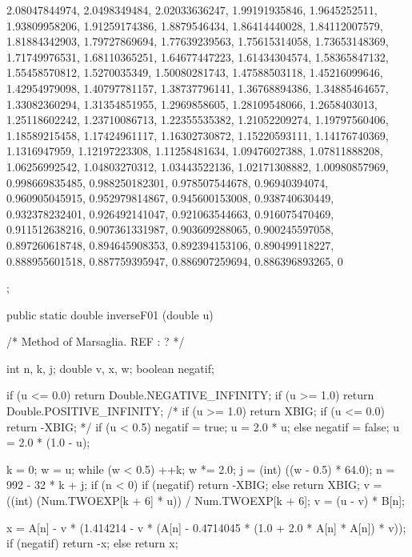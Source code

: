 \begin{code}
\begin{hide}
{     2.08047844974,      2.0498349484,     2.02033636247,
     1.99191935846,      1.9645252511,     1.93809958206,
     1.91259174386,      1.8879546434,     1.86414440028,
     1.84112007579,     1.81884342903,     1.79727869694,
     1.77639239563,     1.75615314058,     1.73653148369,
     1.71749976531,     1.68110365251,     1.64677447223,
     1.61434304574,     1.58365847132,     1.55458570812,
      1.5270035349,     1.50080281743,     1.47588503118,
     1.45216099646,     1.42954979098,     1.40797781157,
     1.38737796141,     1.36768894386,     1.34885464657,
     1.33082360294,     1.31354851955,      1.2969858605,
     1.28109548066,      1.2658403013,     1.25118602242,
     1.23710086713,     1.22355535382,     1.21052209274,
     1.19797560406,     1.18589215458,     1.17424961117,
     1.16302730872,     1.15220593111,     1.14176740369,
      1.1316947959,     1.12197223308,     1.11258481634,
     1.09476027388,     1.07811888208,     1.06256992542,
     1.04803270312,     1.03443522136,     1.02171308882,
     1.00980857969,    0.998669835485,    0.988250182301,
    0.978507544678,     0.96940394074,    0.960905045915,
    0.952979814867,    0.945600153008,    0.938740630449,
    0.932378232401,    0.926492141047,    0.921063544663,
    0.916075470469,    0.911512638216,    0.907361331987,
    0.903609288065,    0.900245597058,    0.897260618748,
    0.894645908353,    0.892394153106,    0.890499118227,
    0.888955601518,    0.887759395947,    0.886907259694,
    0.886396893265,                 0
  
    }; \end{hide}

   public static double inverseF01 (double u)\begin{hide} {

       /* Method of Marsaglia. REF : ? */
 
        int     n, k, j;
        double  v, x, w;
        boolean negatif;

        if (u <= 0.0)
           return Double.NEGATIVE_INFINITY;
        if (u >= 1.0)
           return Double.POSITIVE_INFINITY;
/*        if (u >= 1.0)
           return XBIG;
        if (u <= 0.0)
           return -XBIG;  */
        if (u < 0.5) {
           negatif = true;
           u = 2.0 * u;
        } else {
           negatif = false;
           u = 2.0 * (1.0 - u);
        }

        k = 0;
        w = u;
        while (w < 0.5) {
           ++k;
           w *= 2.0;
        }
        j = (int) ((w - 0.5) * 64.0);
        n = 992 - 32 * k + j;
        if (n < 0) {
           if (negatif)
              return -XBIG;
           else
              return XBIG;
        }
        v = ((int) (Num.TWOEXP[k + 6] * u)) / Num.TWOEXP[k + 6];
        v = (u - v) * B[n];

        x = A[n] - v * (1.414214 - v * (A[n] - 0.4714045 * (1.0 +
                 2.0 * A[n] * A[n]) * v));
        if (negatif)
           return -x;
        else
           return x;

   }\end{hide}
\end{code}
